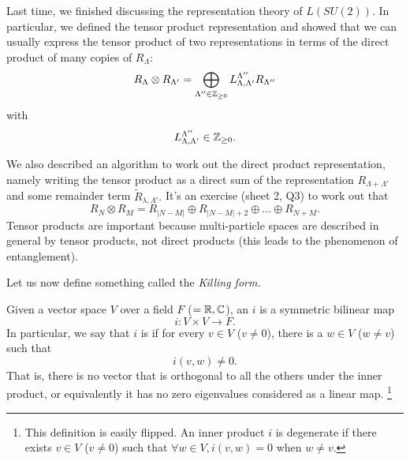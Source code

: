 Last time, we finished discussing the representation theory of $L(SU(2))$. In particular, we defined the tensor product representation and showed that we can usually express the tensor product of two representations in terms of the direct product of many copies of $R_{\Lambda}$:
$$R_\Lambda \otimes R_{\Lambda'}=\bigoplus_{\Lambda'' \in \mathbb{Z}_{\geq 0}} L^{\Lambda''}_{\Lambda,\Lambda'}R_{\Lambda''}$$
with $$L^{\Lambda''}_{\Lambda,\Lambda'}\in \mathbb{Z}_{\geq 0}.$$

We also described an algorithm to work out the direct product representation, namely writing the tensor product as a direct sum of the representation $R_{\Lambda+\Lambda'}$ and some remainder term $\tilde R_{\lambda,\Lambda'}.$ It's an exercise (sheet 2, Q3) to work out that
$$R_N\otimes R_M = R_{|N-M|}\oplus R_{|N-M|+2} \oplus\ldots \oplus R_{N+M}.$$
Tensor products are important because multi-particle spaces are described in general by tensor products, not direct products (this leads to the phenomenon of entanglement).

Let us now define something called the \emph{Killing form.}
\begin{defn}
Given a vector space $V$ over a field $F$ ($=\mathbb{R},\mathbb{C}$), an  $i$ is a symmetric bilinear map
$$i:V\times V \to F.$$
In particular, we say that $i$ is  if for every $v\in V$ ($v\neq 0$), there is a $w\in V$ ($w\neq v$) such that
$$i(v,w)\neq 0.$$ That is, there is no vector that is orthogonal to all the others under the inner product, or equivalently it has no zero eigenvalues considered as a linear map.%
    \footnote{This definition is easily flipped. An inner product $i$ is degenerate if there exists $v\in V$ ($v\neq 0$) such that $\forall w\in V, i(v,w)=0$ when $w\neq v$.}
\end{defn}

